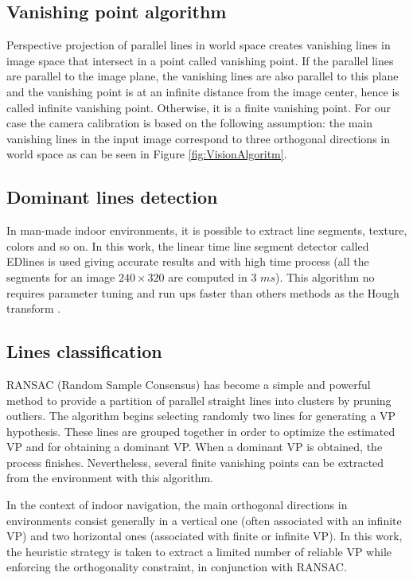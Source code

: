 \subsection{Vanishing point algorithm}
Perspective projection of parallel lines in world space creates vanishing lines in image space that
intersect in a point called vanishing point. If the parallel lines are parallel to the image plane,
the vanishing lines are also parallel to this plane and the vanishing point is at an infinite
distance from the image center, hence is called infinite vanishing point. Otherwise, it is a finite
vanishing point. For our case the camera calibration is based on the following assumption: the main vanishing lines in the input image correspond to three orthogonal directions in world space as can be seen in Figure \ref{fig:VisionAlgoritm}.

\subsection{Dominant lines detection}
In man-made indoor environments, it is possible to extract line segments, texture, colors and so on.
In this work,  the linear time line segment detector called EDlines \cite{Akinlar2011} is used giving accurate results and with high time process (all the segments for an image $240 \times3 20$ are computed in 3 $ms$). This algorithm no requires parameter tuning and run ups faster than others methods as the Hough transform \cite{HoughMAtlab}.

\subsection{Lines classification}

RANSAC (Random Sample Consensus) has become  a simple and powerful method to %
provide a partition of parallel straight lines into clusters by
pruning outliers. \color{blue} The algorithm begins selecting randomly  two lines for generating a VP hypothesis.  These lines  are grouped together in order to optimize the estimated VP and for obtaining a dominant VP.
When a dominant VP is obtained, the process finishes. Nevertheless, several finite vanishing points can be
extracted from the environment with this algorithm. \color{black} \vskip 0.2cm


In the context of indoor navigation, the main orthogonal
directions in environments consist generally in a vertical
one (often associated with an infinite VP) and two horizontal
ones (associated with finite or infinite VP). In this work, the heuristic strategy is taken  to extract a
limited number of reliable VP while enforcing the
orthogonality constraint, in conjunction with RANSAC.  \vskip 0.2cm


